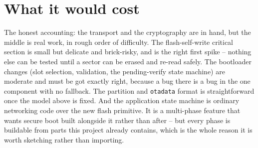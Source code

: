 \section{What it would cost}

The honest accounting: the transport and the cryptography are in hand, but the
middle is real work, in rough order of difficulty. The flash-self-write critical
section is small but delicate and brick-risky, and is the right first spike --
nothing else can be tested until a sector can be erased and re-read safely. The
bootloader changes (slot selection, validation, the pending-verify state machine)
are moderate and must be got exactly right, because a bug there is a bug in the one
component with no fallback. The partition and \texttt{otadata} format is
straightforward once the model above is fixed. And the application state machine is
ordinary networking code over the new flash primitive. It is a multi-phase feature
that wants secure boot built alongside it rather than after -- but every phase is
buildable from parts this project already contains, which is the whole reason it is
worth sketching rather than importing.
